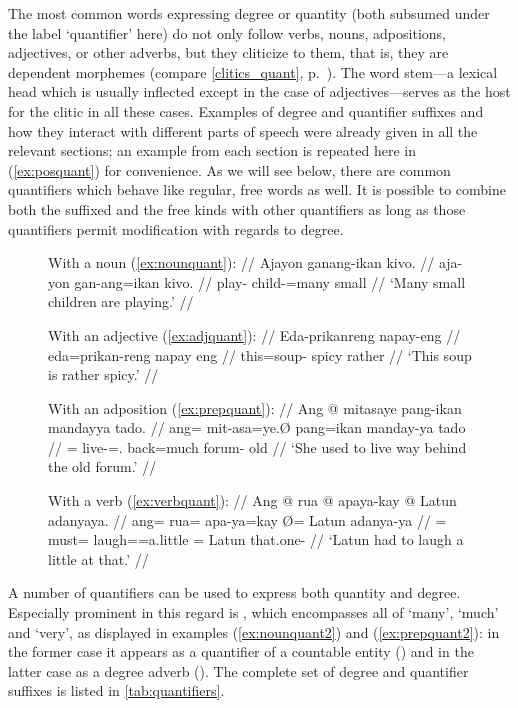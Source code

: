 The most common words expressing degree or quantity (both subsumed under the
label `quantifier' here) do not only follow verbs, nouns, adpositions,
adjectives, or other adverbs, but they cliticize to them, that is, they are
dependent morphemes (compare \autoref{clitics_quant},
p.~\pageref{clitics_quant}). The word stem---a lexical head which is usually
inflected except in the case of adjectives---serves as the host for the clitic
in all these cases. Examples of degree and quantifier suffixes and how they
interact with different parts of speech were already given in all the relevant
sections; an example from each section is repeated here in (\ref{ex:posquant})
for convenience. As we will see below, there are common quantifiers which
behave like regular, free words as well. It is possible to combine both the
suffixed and the free kinds with other quantifiers as long as those quantifiers
permit modification with regards to degree.

\begin{figure}[h]
\pex\label{ex:posquant}
\a\label{ex:nounquant2}\begingl
	\glpreamble With a noun (\ref{ex:nounquant}): //
	\gla Ajayon ganang-ikan kivo. //
	\glb aja-yon gan-ang=ikan kivo. //
	\glc play-\TsgN{} child-\Aarg{}=many small //
	\glft `Many small children are playing.' //
\endgl

\a\label{ex:adjquant2}\begingl
	\glpreamble With an adjective (\ref{ex:adjquant}): //
	\gla Eda-prikanreng napay-eng //
	\glb eda=prikan-reng {napay eng} //
	\glc this=soup-\AargI{} {spicy rather} //
	\glft `This soup is rather spicy.' //
\endgl

\a\label{ex:prepquant2}\begingl
	\glpreamble With an adposition (\ref{ex:prepquant}): //
	\gla Ang @ mitasaye pang-ikan mandayya tado. //
	\glb ang= mit-asa=ye.Ø pang=ikan manday-ya tado //
	\glc \AgtT{}= live-\Hab{}=\TsgF{}.\Top{} back=much forum-\Loc{} old //
	\glft `She used to live way behind the old forum.' //
\endgl

\a\label{ex:verbquant2}\begingl
	\glpreamble With a verb (\ref{ex:verbquant}): //
	\gla Ang @ rua @ apaya-kay {} @ Latun adanyaya. //
	\glb ang= rua= apa-ya=kay Ø= Latun adanya-ya //
	\glc \AgtT{}= must= laugh=\TsgM{}=a.little \Top{}= Latun that.one-\Loc{} //
	\glft `Latun had to laugh a little at that.' //
\endgl
\xe
\end{figure}

A number of quantifiers can be used to express both quantity and degree.
Especially prominent in this regard is , which encompasses
all of `many', `much' and `very', as displayed in examples
(\ref{ex:nounquant2}) and (\ref{ex:prepquant2}): in the former case it
appears as a quantifier of a countable entity
() and in the latter case as a
degree adverb (). The complete set of
degree and quantifier suffixes is listed in \autoref{tab:quantifiers}.

